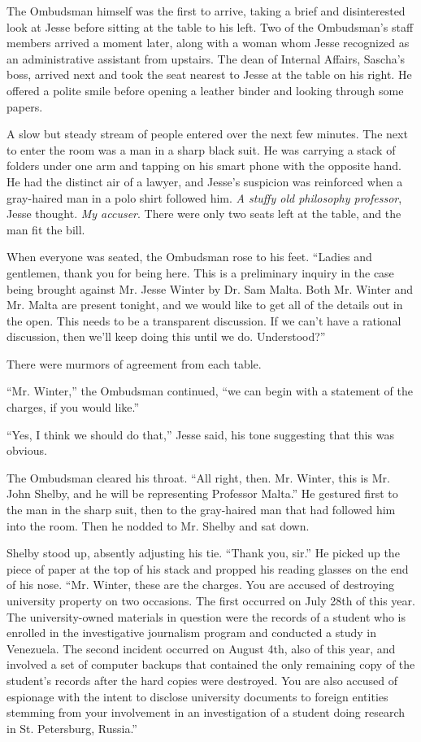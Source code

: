 \documentclass[12pt]{book}
\begin{document}
The Ombudsman himself was the first to arrive, taking a brief and disinterested look at Jesse before sitting at the table to his left.  Two of the Ombudsman's staff members arrived a moment later, along with a woman whom Jesse recognized as an administrative assistant from upstairs.  The dean of Internal Affairs, Sascha's boss, arrived next and took the seat nearest to Jesse at the table on his right.  He offered a polite smile before opening a leather binder and looking through some papers.

A slow but steady stream of people entered over the next few minutes.  The next to enter the room was a man in a sharp black suit.  He was carrying a stack of folders under one arm and tapping on his smart phone with the opposite hand.  He had the distinct air of a lawyer, and Jesse's suspicion was reinforced when a gray-haired man in a polo shirt followed him.  \emph{A stuffy old philosophy professor}, Jesse thought.  \emph{My accuser}.  There were only two seats left at the table, and the man fit the bill.  

When everyone was seated, the Ombudsman rose to his feet.  ``Ladies and gentlemen, thank you for being here.  This is a preliminary inquiry in the case being brought against Mr. Jesse Winter by Dr. Sam Malta.  Both Mr. Winter and Mr. Malta are present tonight, and we would like to get all of the details out in the open.  This needs to be a transparent discussion.  If we can't have a rational discussion, then we'll keep doing this until we do.  Understood?''

There were murmors of agreement from each table.

``Mr. Winter,'' the Ombudsman continued, ``we can begin with a statement of the charges, if you would like.''

``Yes, I think we should do that,'' Jesse said, his tone suggesting that this was obvious.

The Ombudsman cleared his throat.  ``All right, then.  Mr. Winter, this is Mr. John Shelby, and he will be representing Professor Malta.''  He gestured first to the man in the sharp suit, then to the gray-haired man that had followed him into the room.  Then he nodded to Mr. Shelby and sat down.

Shelby stood up, absently adjusting his tie.  ``Thank you, sir.''  He picked up the piece of paper at the top of his stack and propped his reading glasses on the end of his nose.  ``Mr. Winter, these are the charges.  You are accused of destroying university property on two occasions.  The first occurred on July 28th of this year.  The university-owned materials in question were the records of a student who is enrolled in the investigative journalism program and conducted a study in Venezuela.  The second incident occurred on August 4th, also of this year, and involved a set of computer backups that contained the only remaining copy of the student's records after the hard copies were destroyed.  You are also accused of espionage with the intent to disclose university documents to foreign entities stemming from your involvement in an investigation of a student doing research in St. Petersburg, Russia.''
\end{document}
